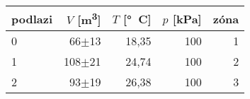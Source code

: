 \begin{tabular}{lrrrr}
\toprule
podlazi & $V$ [\si{m^3}] & $T$ [\si{\degree C}] & $p$ [kPa] & zóna\\
\midrule
0 &        66$\pm$13 &18,35& 100&1\\
1 &       108$\pm$21 &24,74& 100&2\\
2 &        93$\pm$19 &26,38& 100&3\\
\bottomrule
\end{tabular}
